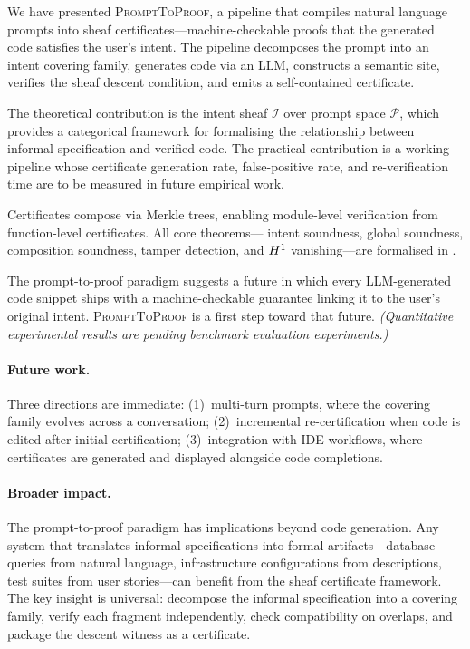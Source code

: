 \documentclass[11pt]{article}
\newcommand{\PromptToProof}{\textsc{PromptToProof}}
\newcommand{\IntentSheaf}{\mathcal{I}}
\newcommand{\PromptSpace}{\mathcal{P}}
\begin{document}
We have presented \PromptToProof{}, a pipeline that compiles natural
language prompts into sheaf certificates---machine-checkable proofs
that the generated code satisfies the user's intent.  The pipeline
decomposes the prompt into an intent covering family, generates code
via an LLM, constructs a \JuGeo{} semantic site, verifies the sheaf
descent condition, and emits a self-contained certificate.

The theoretical contribution is the intent sheaf $\IntentSheaf$ over
prompt space $\PromptSpace$, which provides a categorical framework
for formalising the relationship between informal specification and
verified code.  The practical contribution is a working pipeline
whose certificate generation rate, false-positive rate, and
re-verification time are to be measured in future empirical work.

Certificates compose via Merkle trees, enabling module-level
verification from function-level certificates.  All core theorems---
intent soundness, global soundness, composition soundness, tamper
detection, and $H^{1}$ vanishing---are formalised in \LEAN{}.

The prompt-to-proof paradigm suggests a future in which every
LLM-generated code snippet ships with a machine-checkable guarantee
linking it to the user's original intent.  \PromptToProof{} is a
first step toward that future.
\emph{(Quantitative experimental results are pending benchmark evaluation experiments.)}

\paragraph{Future work.}
Three directions are immediate:
(1)~multi-turn prompts, where the covering family evolves across
a conversation;
(2)~incremental re-certification when code is edited after initial
certification;
(3)~integration with IDE workflows, where certificates are generated
and displayed alongside code completions.

\paragraph{Broader impact.}
The prompt-to-proof paradigm has implications beyond code generation.
Any system that translates informal specifications into formal
artifacts---database queries from natural language, infrastructure
configurations from descriptions, test suites from user
stories---can benefit from the sheaf certificate framework.  The key
insight is universal: decompose the informal specification into a
covering family, verify each fragment independently, check
compatibility on overlaps, and package the descent witness as a
certificate.
\end{document}
